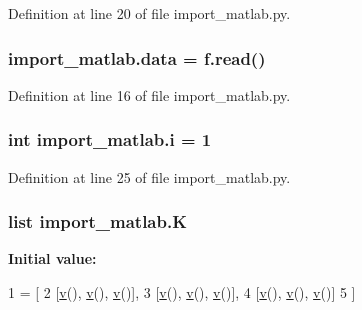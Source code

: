 Definition at line 20 of file import\+\_\+matlab.\+py.

\subsubsection[{\texorpdfstring{data}{data}}]{\setlength{\rightskip}{0pt plus 5cm}import\+\_\+matlab.\+data = f.\+read()}\hypertarget{namespaceimport__matlab_afe357346cb875eacc89e2820a1fa44ea}{}\label{namespaceimport__matlab_afe357346cb875eacc89e2820a1fa44ea}


Definition at line 16 of file import\+\_\+matlab.\+py.

\subsubsection[{\texorpdfstring{i}{i}}]{\setlength{\rightskip}{0pt plus 5cm}int import\+\_\+matlab.\+i = 1}\hypertarget{namespaceimport__matlab_aea76e0452b3fe0bf3b1340e4f2383a36}{}\label{namespaceimport__matlab_aea76e0452b3fe0bf3b1340e4f2383a36}


Definition at line 25 of file import\+\_\+matlab.\+py.

\subsubsection[{\texorpdfstring{K}{K}}]{\setlength{\rightskip}{0pt plus 5cm}list import\+\_\+matlab.\+K}\hypertarget{namespaceimport__matlab_aabc884a43d7f54d120363b5b1f7aa797}{}\label{namespaceimport__matlab_aabc884a43d7f54d120363b5b1f7aa797}
{\bfseries Initial value\+:}
\begin{DoxyCode}
1 = [
2         [\hyperlink{namespaceimport__matlab_a43c35054e148e026c772896fcf0ee506}{v}(), \hyperlink{namespaceimport__matlab_a43c35054e148e026c772896fcf0ee506}{v}(), \hyperlink{namespaceimport__matlab_a43c35054e148e026c772896fcf0ee506}{v}()],
3         [\hyperlink{namespaceimport__matlab_a43c35054e148e026c772896fcf0ee506}{v}(), \hyperlink{namespaceimport__matlab_a43c35054e148e026c772896fcf0ee506}{v}(), \hyperlink{namespaceimport__matlab_a43c35054e148e026c772896fcf0ee506}{v}()],
4         [\hyperlink{namespaceimport__matlab_a43c35054e148e026c772896fcf0ee506}{v}(), \hyperlink{namespaceimport__matlab_a43c35054e148e026c772896fcf0ee506}{v}(), \hyperlink{namespaceimport__matlab_a43c35054e148e026c772896fcf0ee506}{v}()]
5     ]
\end{DoxyCode}



